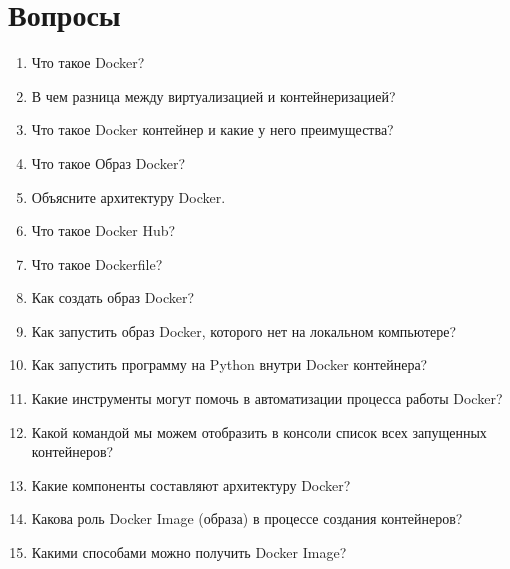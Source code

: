 \documentclass[letterpaper,10pt,russian]{sphinxmanual}
\begin{document}
\section{Вопросы}
\label{\detokenize{educational_materials/docker_base/quiz:id1}}\label{\detokenize{educational_materials/docker_base/quiz::doc}}\begin{enumerate}
%
\item {} 
\sphinxAtStartPar
Что такое Docker?

\item {} 
\sphinxAtStartPar
В чем разница между виртуализацией и контейнеризацией?

\item {} 
\sphinxAtStartPar
Что такое Docker контейнер и какие у него преимущества?

\item {} 
\sphinxAtStartPar
Что такое Образ Docker?

\item {} 
\sphinxAtStartPar
Объясните архитектуру Docker.

\item {} 
\sphinxAtStartPar
Что такое Docker Hub?

\item {} 
\sphinxAtStartPar
Что такое Dockerfile?

\item {} 
\sphinxAtStartPar
Как создать образ Docker?

\item {} 
\sphinxAtStartPar
Как запустить образ Docker, которого нет на локальном компьютере?

\item {} 
\sphinxAtStartPar
Как запустить программу на Python внутри Docker контейнера?

\item {} 
\sphinxAtStartPar
Какие инструменты могут помочь в автоматизации процесса работы Docker?

\item {} 
\sphinxAtStartPar
Какой командой мы можем отобразить в консоли список всех запущенных контейнеров?

\item {} 
\sphinxAtStartPar
Какие компоненты составляют архитектуру Docker?

\item {} 
\sphinxAtStartPar
Какова роль Docker Image (образа) в процессе создания контейнеров?

\item {} 
\sphinxAtStartPar
Какими способами можно получить Docker Image?


\end{enumerate}
\end{document}
